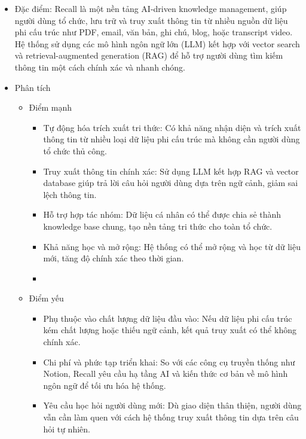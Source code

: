 \begin{itemize}
\item
  Đặc điểm: Recall là một nền tảng AI-driven knowledge management, giúp
  người dùng tổ chức, lưu trữ và truy xuất thông tin từ nhiều nguồn dữ
  liệu phi cấu trúc như PDF, email, văn bản, ghi chú, blog, hoặc
  transcript video. Hệ thống sử dụng các mô hình ngôn ngữ lớn (LLM) kết
  hợp với vector search và retrieval-augmented generation (RAG) để hỗ
  trợ người dùng tìm kiếm thông tin một cách chính xác và nhanh chóng.
\item
  Phân tích

  \begin{itemize}
  \item
    Điểm mạnh

    \begin{itemize}
    \item
      Tự động hóa trích xuất tri thức: Có khả năng nhận diện và trích
      xuất thông tin từ nhiều loại dữ liệu phi cấu trúc mà không cần
      người dùng tổ chức thủ công.
    \item
      Truy xuất thông tin chính xác: Sử dụng LLM kết hợp RAG và vector
      database giúp trả lời câu hỏi người dùng dựa trên ngữ cảnh, giảm
      sai lệch thông tin.
    \item
      Hỗ trợ hợp tác nhóm: Dữ liệu cá nhân có thể được chia sẻ thành
      knowledge base chung, tạo nền tảng tri thức cho toàn tổ chức.
    \item
      Khả năng học và mở rộng: Hệ thống có thể mở rộng và học từ dữ liệu
      mới, tăng độ chính xác theo thời gian.
    \item
    \end{itemize}
  \item
    Điểm yếu

    \begin{itemize}
    \item
      Phụ thuộc vào chất lượng dữ liệu đầu vào: Nếu dữ liệu phi cấu trúc
      kém chất lượng hoặc thiếu ngữ cảnh, kết quả truy xuất có thể không
      chính xác.
    \item
      Chi phí và phức tạp triển khai: So với các công cụ truyền thống
      như Notion, Recall yêu cầu hạ tầng AI và kiến thức cơ bản về mô
      hình ngôn ngữ để tối ưu hóa hệ thống.
    \item
      Yêu cầu học hỏi người dùng mới: Dù giao diện thân thiện, người
      dùng vẫn cần làm quen với cách hệ thống truy xuất thông tin dựa
      trên câu hỏi tự nhiên.
    \end{itemize}
  \end{itemize}
\end{itemize}

